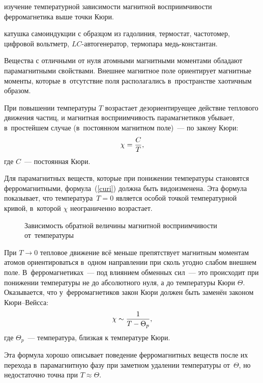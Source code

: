 
\begin{lab:aim}
	изучение температурной зависимости магнитной восприимчивости ферромагнетика выше точки Кюри.
\end{lab:aim}

\begin{lab:equipment}
	катушка самоиндукции с образцом из гадолиния, термостат, частотомер, цифровой вольтметр, $LC$-автогенератор,
	термопара медь-константан.
\end{lab:equipment}

Вещества с отличными от нуля атомными магнитными моментами обладают парамагнитными свойствами. Внешнее магнитное поле
ориентирует магнитные моменты, которые в~отсутствие поля располагались в~пространстве хаотичным образом.

При повышении температуры $T$ возрастает дезориентируещее действие теплового движения частиц, и магнитная
восприимчивость парамагнетиков убывает, в~простейшем случае (в~постоянном магнитном поле)~--- по закону Кюри:
\begin{equation}%
	\chi=\frac{C}{T},
	\eqmark{curi}
\end{equation}
где $C$~--- постоянная Кюри.

Для парамагнитных веществ, которые при понижении температуры становятся ферромагнитными, формула~(\eqref{curi}) должна быть
видоизменена. Эта формула показывает, что температура~$T=0$ является особой точкой температурной кривой, в~которой
$\chi$ неограниченно возрастает.

\begin{wrapfigure}{r}{0.4\textwidth}
	\caption{Зависимость обратной величины магнитной восприимчивости от~температуры}
\end{wrapfigure}

При $T\to 0$ тепловое движение всё меньше препятствует магнитным моментам атомов ориентироваться в~одном направлении при
сколь угодно слабом внешнем поле. В~ферромагнетиках~--- под влиянием обменных сил~--- это происходит при понижении
температуры не до абсолютного нуля, а до температуры Кюри $\Theta$. Оказывается, что у~ферромагнетиков закон Кюри должен
быть заменён законом Кюри--Вейсса:
\begin{equation}%
	\chi\sim \frac{1}{T-\Theta_p},
	\eqmark{curi-veis}
\end{equation}
где $\Theta_p$~--- температура, близкая к температуре Кюри.

Эта формула хорошо описывает поведение ферромагнитных веществ после их перехода в~парамагнитную фазу при заметном
удалении температуры от~$\Theta$, но недостаточно точна при $T\approx \Theta$.

